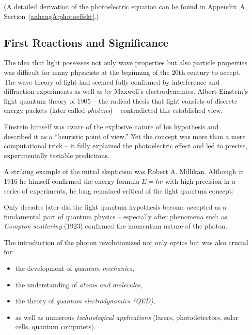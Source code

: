 (A detailed derivation of the photoelectric equation can be found in Appendix~A, Section~\ref{anhangA:photoeffekt}.)
\subsection{First Reactions and Significance}

The idea that light possesses not only wave properties but also particle properties was difficult for many physicists at the beginning of the 20th century to accept. The wave theory of light had seemed fully confirmed by interference and diffraction experiments as well as by Maxwell’s electrodynamics. Albert Einstein’s light quantum theory of 1905 – the radical thesis that light consists of discrete energy packets (later called \emph{photons}) – contradicted this established view.

Einstein himself was aware of the explosive nature of his hypothesis and described it as a “heuristic point of view.” Yet the concept was more than a mere computational trick – it fully explained the photoelectric effect and led to precise, experimentally testable predictions.

A striking example of the initial skepticism was Robert A. Millikan. Although in 1916 he himself confirmed the energy formula \( E = h \nu \) with high precision in a series of experiments, he long remained critical of the light quantum concept:

Only decades later did the light quantum hypothesis become accepted as a fundamental part of quantum physics – especially after phenomena such as \emph{Compton scattering} (1923) confirmed the momentum nature of the photon.


The introduction of the photon revolutionized not only optics but was also crucial for:
\begin{itemize}
	\item the development of \emph{quantum mechanics},
	\item the understanding of \emph{atoms and molecules},
	\item the theory of \emph{quantum electrodynamics (QED)},
	\item as well as numerous \emph{technological applications} (lasers, photodetectors, solar cells, quantum computers).
\end{itemize}

